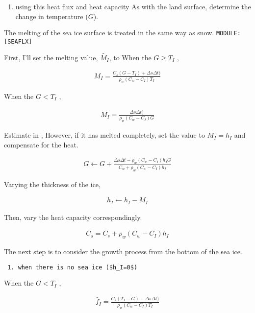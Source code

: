 \begin{enumerate}
\def\labelenumi{\arabic{enumi}.}
\setcounter{enumi}{1}
\tightlist
\item
  using this heat flux and heat capacity As with the land surface,
  determine the change in temperature (\(G\)).
\end{enumerate}

The melting of the sea ice surface is treated in the same way as snow.
\texttt{MODULE:{[}SEAFLX{]}}

First, I'll set the melting value, \(\tilde{M_I}\), to When the
\(G \ge T_I\) ,

\begin{eqnarray}
  M_I
  =  \frac{C_s ( G - T_I ) + \Delta s \Delta t )}
          {\rho_w ( C_w - C_I ) T_I }
\end{eqnarray}

When the \(G < T_I\) ,

\begin{eqnarray}
  M_I
  =  \frac{\Delta s \Delta t )}
          {\rho_w ( C_w - C_I ) G}
\end{eqnarray}

Estimate in , However, if it has melted completely, set the value to
\(M_I=h_I\) and compensate for the heat.

\begin{eqnarray}
  G \leftarrow G + \frac{ \Delta s \Delta t 
                          - \rho_w ( C_w - C_I ) h_I G  }
                        { C_w + \rho_w ( C_w - C_I ) h_I}
\end{eqnarray}

Varying the thickness of the ice,

\begin{eqnarray}
  h_I \leftarrow h_I - M_I 
\end{eqnarray}

Then, vary the heat capacity correspondingly.

\begin{eqnarray}
  C_s = C_s + \rho_w ( C_w - C_I ) h_I
\end{eqnarray}

The next step is to consider the growth process from the bottom of the
sea ice.

\begin{verbatim}
 1. when there is no sea ice ($h_I=0$)
\end{verbatim}

When the \(G < T_I\) ,

\begin{eqnarray}
  \tilde{f_I}
  =  \frac{C_s ( T_I - G ) - \Delta s \Delta t )}
          {\rho_w ( C_w - C_I ) T_I }
\end{eqnarray}

